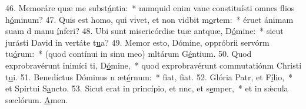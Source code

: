 46. Memoráre quæ me subst\uline{á}ntia:~* numquid enim vane constituísti omnes flios h\uline{ó}minum?
47. Quis est homo, qui vivet, et non vidbit m\uline{o}rtem:~* éruet ánimam suam d manu \uline{í}nferi?
48. Ubi sunt misericórdiæ tuæ antquæ, D\uline{ó}mine:~* sicut jurásti David in vertáte t\uline{u}a?
49. Memor esto, Dómine, oppróbrii servórm tu\uline{ó}rum:~* (quod contínui in sinu meo) mltárum G\uline{é}ntium.
50. Quod exprobravérunt inimíci ti, D\uline{ó}mine,~* quod exprobravérunt commutatiónm Christi t\uline{u}i.
51. Benedíctus Dóminus n æt\uline{é}rnum:~* fiat, f\uline{i}at.
52. Glória Patr, et F\uline{í}lio,~* et Spirtui S\uline{a}ncto.
53. Sicut erat in princípio, et nnc, et s\uline{e}mper,~* et in sǽcula sæclórum. \uline{A}men.
